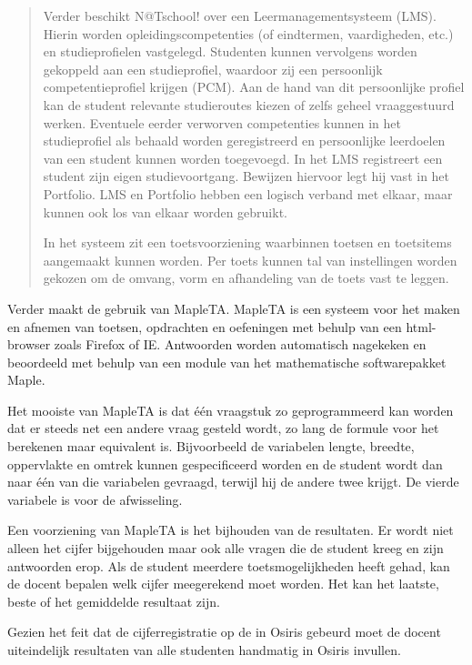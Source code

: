 \begin{quotation}
Verder beschikt N@Tschool! over een Leermanagementsysteem
(LMS). Hierin worden opleidingscompetenties (of eindtermen,
vaardigheden, etc.) en studieprofielen vastgelegd. Studenten kunnen
vervolgens worden gekoppeld aan een studieprofiel, waardoor zij een
persoonlijk competentieprofiel krijgen (PCM). Aan de hand van dit
persoonlijke profiel kan de student relevante studieroutes kiezen of
zelfs geheel vraaggestuurd werken. Eventuele eerder verworven
competenties kunnen in het studieprofiel als behaald worden
geregistreerd en persoonlijke leerdoelen van een student kunnen worden
toegevoegd. In het LMS registreert een student zijn eigen
studievoortgang. Bewijzen hiervoor legt hij vast in het Portfolio. LMS
en Portfolio hebben een logisch verband met elkaar, maar kunnen ook
los van elkaar worden gebruikt.

In het systeem zit een toetsvoorziening waarbinnen toetsen en
toetsitems aangemaakt kunnen worden. Per toets kunnen tal van
instellingen worden gekozen om de omvang, vorm en afhandeling van de
toets vast te leggen.
\end{quotation}

Verder maakt de \HR{} gebruik van MapleTA. MapleTA is een systeem voor
het maken en afnemen van toetsen, opdrachten en oefeningen met behulp
van een html-browser zoals Firefox of IE. Antwoorden worden
automatisch nagekeken en beoordeeld met behulp van een module van het
mathematische softwarepakket Maple.

Het mooiste van MapleTA is dat één vraagstuk zo geprogrammeerd kan
worden dat er steeds net een andere vraag gesteld wordt, zo lang de
formule voor het berekenen maar equivalent is. Bijvoorbeeld de
variabelen lengte, breedte, oppervlakte en omtrek kunnen
gespecificeerd worden en de student wordt dan naar één van die
variabelen gevraagd, terwijl hij de andere twee krijgt. De vierde
variabele is voor de afwisseling.

Een voorziening van MapleTA is het bijhouden van de resultaten. Er
wordt niet alleen het cijfer bijgehouden maar ook alle vragen die de
student kreeg en zijn antwoorden erop. Als de student meerdere
toetsmogelijkheden heeft gehad, kan de docent bepalen welk cijfer
meegerekend moet worden. Het kan het laatste, beste of het gemiddelde
resultaat zijn.

Gezien het feit dat de cijferregistratie op de \HR{} in Osiris gebeurd
moet de docent uiteindelijk resultaten van alle studenten handmatig in
Osiris invullen.


